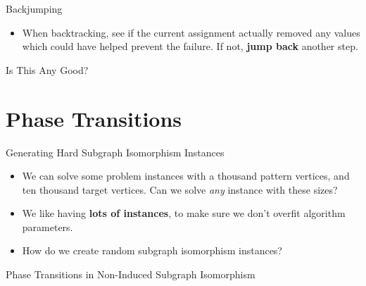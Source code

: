 \documentclass{beamer}
\begin{document}
\begin{frame}{Backjumping}

    \begin{itemize}
        \item When backtracking, see if the current assignment actually removed any values which
            could have helped prevent the failure. If not, \textbf{jump back} another step.
    \end{itemize}

\end{frame}

\begin{frame}{Is This Any Good?}

    

\end{frame}

\section{Phase Transitions}

\begin{frame}{Generating Hard Subgraph Isomorphism Instances}

    \begin{itemize}
        \item We can solve some problem instances with a thousand pattern vertices, and ten thousand
            target vertices. Can we solve \emph{any} instance with these sizes?

        \item We like having \textbf{lots of instances}, to make sure we don't overfit algorithm
            parameters.

        \item How do we create random subgraph isomorphism instances?
    \end{itemize}

\end{frame}

\begin{frame}{Phase Transitions in Non-Induced Subgraph Isomorphism}

    

\end{frame}
\end{document}
